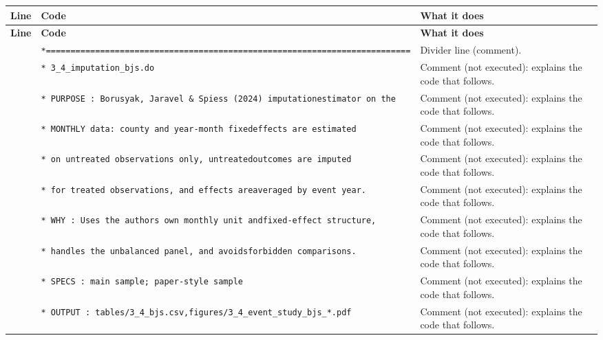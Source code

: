 \documentclass[10pt]{article}
\newcommand{\codetable}[1]{%
{\footnotesize
\begin{longtable}{>{\raggedleft\arraybackslash}p{0.55cm}>{\raggedright\arraybackslash}p{8.3cm}>{\raggedright\arraybackslash}p{8.0cm}}
\toprule \textbf{Line} & \textbf{Code} & \textbf{What it does}\\ \midrule \endfirsthead
\toprule \textbf{Line} & \textbf{Code} & \textbf{What it does}\\ \midrule \endhead
\bottomrule \endfoot
#1
\end{longtable}}}
\begin{document}
\codetable{1 & \texttt{*=========================================================\newline \hspace*{1em}=================} & Divider line (comment).\\
2 & \texttt{* 3\_4\_imputation\_bjs.do} & Comment (not executed): explains the code that follows.\\
3 & \texttt{* PURPOSE : Borusyak, Jaravel \& Spiess (2024) imputation\newline \hspace*{1em}estimator on the} & Comment (not executed): explains the code that follows.\\
4 & \texttt{*           MONTHLY data: county and year-{}month fixed\newline \hspace*{1em}effects are estimated} & Comment (not executed): explains the code that follows.\\
5 & \texttt{*           on untreated observations only, untreated\newline \hspace*{1em}outcomes are imputed} & Comment (not executed): explains the code that follows.\\
6 & \texttt{*           for treated observations, and effects are\newline \hspace*{1em}averaged by event year.} & Comment (not executed): explains the code that follows.\\
7 & \texttt{* WHY     : Uses the authors\textquotesingle{} own monthly unit and\newline \hspace*{1em}fixed-{}effect structure,} & Comment (not executed): explains the code that follows.\\
8 & \texttt{*           handles the unbalanced panel, and avoids\newline \hspace*{1em}forbidden comparisons.} & Comment (not executed): explains the code that follows.\\
9 & \texttt{* SPECS   : main sample; paper-{}style sample} & Comment (not executed): explains the code that follows.\\
10 & \texttt{* OUTPUT  : tables/3\_4\_bjs.csv,\newline \hspace*{1em}figures/3\_4\_event\_study\_bjs\_*.pdf} & Comment (not executed): explains the code that follows.\\
}
\end{document}
